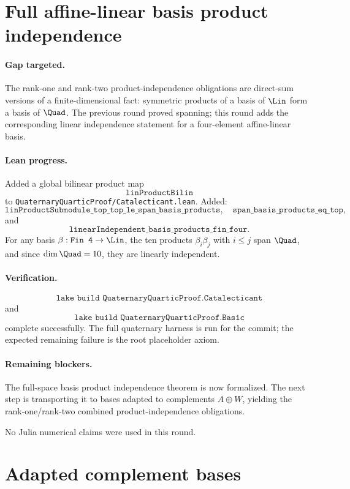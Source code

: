 \documentclass[11pt]{article}
\begin{document}
\section*{Full affine-linear basis product independence}

\paragraph{Gap targeted.}
The rank-one and rank-two product-independence obligations are direct-sum
versions of a finite-dimensional fact: symmetric products of a basis of
\(\Lin\) form a basis of \(\Quad\).  The previous round proved spanning; this
round adds the corresponding linear independence statement for a
four-element affine-linear basis.

\paragraph{Lean progress.}
Added a global bilinear product map
\[
\texttt{linProductBilin}
\]
to \texttt{QuaternaryQuarticProof/Catalecticant.lean}.  Added:
\[
\texttt{linProductSubmodule\_top\_top\_le\_span\_basis\_products},
\quad
\texttt{span\_basis\_products\_eq\_top},
\]
and
\[
\texttt{linearIndependent\_basis\_products\_fin\_four}.
\]
For any basis \(\beta:\texttt{Fin 4}\to\Lin\), the ten products
\(\beta_i\beta_j\) with \(i\le j\) span \(\Quad\), and since
\(\dim\Quad=10\), they are linearly independent.

\paragraph{Verification.}
\[
\texttt{lake build QuaternaryQuarticProof.Catalecticant}
\]
and
\[
\texttt{lake build QuaternaryQuarticProof.Basic}
\]
complete successfully.  The full quaternary harness is run for the commit; the
expected remaining failure is the root placeholder axiom.

\paragraph{Remaining blockers.}
The full-space basis product independence theorem is now formalized.  The next
step is transporting it to bases adapted to complements \(A\oplus W\), yielding
the rank-one/rank-two combined product-independence obligations.

No Julia numerical claims were used in this round.

\section*{Adapted complement bases}
\end{document}

